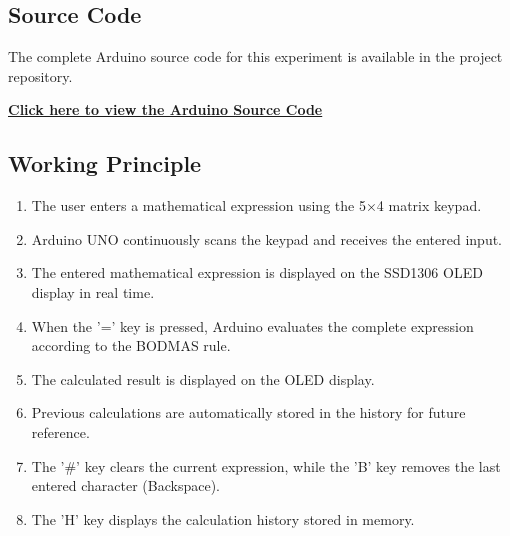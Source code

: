 
\subsection{Source Code}

The complete Arduino source code for this experiment is available in the project repository.

\href{https://github.com/YOUR_USERNAME/YOUR_REPOSITORY/blob/main/Exp-2/BODMAS_Calculator/BODMAS_Calculator.ino}
{\textbf{Click here to view the Arduino Source Code}}



\subsection{Working Principle}

\begin{enumerate}

\item The user enters a mathematical expression using the 5×4 matrix keypad.

\item Arduino UNO continuously scans the keypad and receives the entered input.

\item The entered mathematical expression is displayed on the SSD1306 OLED display in real time.

\item When the '=' key is pressed, Arduino evaluates the complete expression according to the BODMAS rule.

\item The calculated result is displayed on the OLED display.

\item Previous calculations are automatically stored in the history for future reference.

\item The '\#' key clears the current expression, while the 'B' key removes the last entered character (Backspace).

\item The 'H' key displays the calculation history stored in memory.

\end{enumerate}

